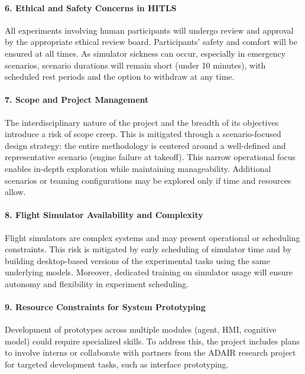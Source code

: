 \documentclass[12pt,a4paper]{article} %
\begin{document}
	\paragraph{6. Ethical and Safety Concerns in HITLS}

	All experiments involving human participants will undergo review and approval by the appropriate ethical review board. Participants' safety and comfort will be ensured at all times. As simulator sickness can occur, especially in emergency scenarios, scenario durations will remain short (under 10 minutes), with scheduled rest periods and the option to withdraw at any time.

	\paragraph{7. Scope and Project Management}

	The interdisciplinary nature of the project and the breadth of its objectives introduce a risk of scope creep. This is mitigated through a scenario-focused design strategy: the entire methodology is centered around a well-defined and representative scenario (engine failure at takeoff). This narrow operational focus enables in-depth exploration while maintaining manageability. Additional scenarios or teaming configurations may be explored only if time and resources allow.

	\paragraph{8. Flight Simulator Availability and Complexity}

	Flight simulators are complex systems and may present operational or scheduling constraints. This risk is mitigated by early scheduling of simulator time and by building desktop-based versions of the experimental tasks using the same underlying models. Moreover, dedicated training on simulator usage will ensure autonomy and flexibility in experiment scheduling.

	\paragraph{9. Resource Constraints for System Prototyping}

	Development of prototypes across multiple modules (agent, HMI, cognitive model) could require specialized skills. To address this, the project includes plans to involve interns or collaborate with partners from the ADAIR research project for targeted development tasks, such as interface prototyping.
\end{document}
